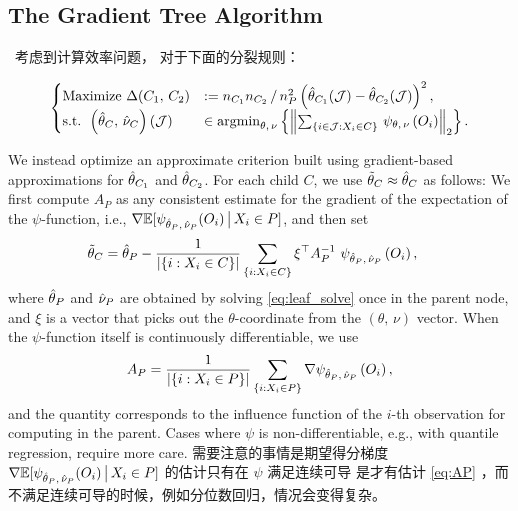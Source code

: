 \documentclass[aos]{imsart}
\theoremstyle{plain}
\theoremstyle{definition}
\theoremstyle{remark}
\begin{document}
\begin{CJK}{UTF8}{gbsn}
\subsection{The Gradient Tree Algorithm}
\, 考虑到计算效率问题， 对于下面的分裂规则：

\begin{equation*}
    \begin{cases}
    \text{Maximize }  \Delta(C_1, \, C_2) &:= {n_{C_1} n_{C_2}}\,/\,{n_P^2}  \p{\htheta_{C_1}(\mathcal{J}) - \htheta_{C_2}(\mathcal{J})}^2, \\
     \text{s.t. }   \p{\htheta_{C}, \, \hnu_{C}}(\mathcal{J}) &\in \argmin_{\theta, \, \nu} \cb{\Norm{\sum_{\cb{i\in\mathcal{J} : X_i \in C}} \, \psi_{\theta, \, \nu}\p{O_i}}_2}.
    \end{cases}
\end{equation*}

We instead optimize an approximate criterion 
built using gradient-based approximations for $\hat{\theta}_{C_1}$ and $\hat{\theta}_{C_2}$. For each child $C$, we use $\tilde{\theta}_C \approx \hat{\theta}_C$ as follows: We first compute $A_P$ as any consistent estimate for the gradient of the expectation of the $\psi$-function, i.e.,
$\nabla \mathbb{E}[\psi_{\hat{\theta}_P, \, \hat{\nu}_P}(O_i) \,\big|\, X_i \in P]$, and then set
\begin{align}
\label{eq:ttheta}
&\ttheta_C = \htheta_P - \frac{1}{\abs{\cb{i : X_i \in C}}} \sum_{\cb{i : X_i \in C}} \xi^\top A^{-1}_P \ \psi_{\htheta_P, \, \hnu_P}\p{O_i},
\end{align}
where $\hat{\theta}_P$ and $\hat{\nu}_P$ are obtained by solving \eqref{eq:leaf_solve} once in the parent node,
and $\xi$ is a vector that picks out the $\theta$-coordinate from the $(\theta, \, \nu)$ vector.
When the $\psi$-function itself is continuously differentiable, we use
\begin{equation}
\label{eq:AP}
A_P= \frac{1}{\abs{\cb{i : X_i \in P}}} \sum_{\cb{i : X_i \in P}} \nabla \psi_{\htheta_P, \, \hnu_P}\p{O_i},
\end{equation}
and the quantity  corresponds
to the influence function of the $i$-th observation for computing  in the parent.
Cases where $\psi$ is non-differentiable, e.g., with quantile regression, require more care. 需要注意的事情是期望得分梯度 $\nabla \mathbb{E}[\psi_{\hat{\theta}_P, \, \hat{\nu}_P}(O_i) \,\big|\, X_i \in P]$ 的估计只有在 $\psi$ 满足连续可导 是才有估计 \eqref{eq:AP} ，而不满足连续可导的时候，例如分位数回归，情况会变得复杂。



\end{CJK}
\end{document}
